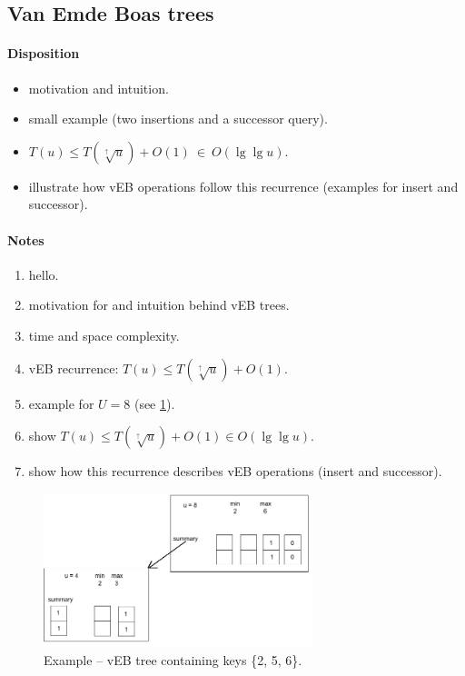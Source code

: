 \newpage
\subsection{Van Emde Boas trees}

\paragraph{Disposition}
\begin{itemize}
\item motivation and intuition.

\item small example (two insertions and a successor query).

\item $T(u) \leq T(\sqrt[\uparrow]{u}) + O(1)\ \in\ O(\lg \lg u)$.

\item illustrate how vEB operations follow this recurrence (examples for
  insert and successor).

\end{itemize}



\paragraph{Notes}

\begin{enumerate}

  \item hello.

  \item motivation for and intuition behind vEB trees.

  \item time and space complexity.\\

  \item vEB recurrence: $T(u) \leq T(\sqrt[\uparrow]{u}) + O(1)$.

  \item example for $U = 8$ (see \cref{fig:veb_example}).

  \item show $T(u) \leq T(\sqrt[\uparrow]{u}) + O(1) \in O(\lg \lg u)$.

  \item show how this recurrence describes vEB operations (insert and successor).

\end{enumerate}

\begin{figure}[H]
  \centering
  \includegraphics[width=0.7\textwidth]{figures/veb_example.png}
  \caption{Example -- vEB tree containing keys \{2, 5, 6\}.}
  \label{fig:veb_example}
\end{figure}
